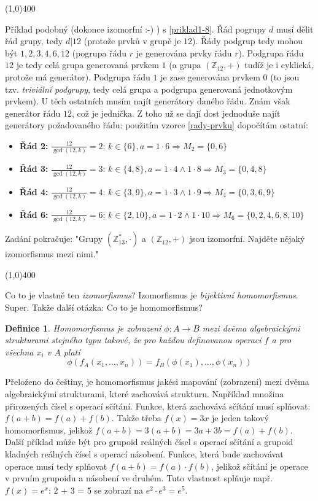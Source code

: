 \documentclass{article}
\newtheorem{definice}{Definice}[section]
\begin{document}
\line(1,0){400}

Příklad podobný (dokonce izomorfní :-) ) s \ref{priklad1-8}.
Řád pogrupy $d$ musí dělit řád grupy, tedy $d | 12$ (protože prvků v grupě je $12$). Řády podgrup tedy mohou být ${1,2,3,4,6,12}$ (pogrupa řádu $r$ je generována prvky řádu $r$). Podgrupa řádu $12$ je tedy celá grupa generovaná prvkem $1$ (a grupa $(\mathbb{Z}_{12},+)$ tudíž je i cyklická, protože má generátor). Podgrupa řádu $1$ je zase generována prvkem $0$ (to jsou tzv. \textit{triviální podgrupy}, tedy celá grupa a podgrupa generovaná jednotkovým prvkem). U těch ostatních musím najít generátory daného řádu. Znám však generátor řádu $12$, což je jednička. Z toho už se dají dost jednoduše najít generátory požadovaného řádu: použitím vzorce \ref{rady-prvku} dopočítám ostatní:

\begin{itemize}
	\item \textbf{Řád 2:} $\frac{12}{\gcd(12, k)} = 2$: $k \in \{6\}, a = 1 \cdot 6 \Rightarrow M_2 = \{0,6\}$
	\item \textbf{Řád 3:} $\frac{12}{\gcd(12, k)} = 3$: $k \in \{4,8\}, a = 1\cdot 4 \wedge 1 \cdot 8 \Rightarrow M_3 = \{0, 4, 8\}$
	\item \textbf{Řád 4:} $\frac{12}{\gcd(12, k)} = 4$: $k \in \{3,9\}, a = 1\cdot 3 \wedge 1\cdot 9 \Rightarrow M_4 = \{0, 3, 6, 9\}$
	\item \textbf{Řád 6:} $\frac{12}{\gcd(12, k)} = 6$: $k \in \{2,10\}, a = 1\cdot 2 \wedge 1 \cdot 10 \Rightarrow M_6 = \{0, 2, 4, 6, 8, 10\}$
\end{itemize}  

Zadání pokračuje:
"Grupy $(\mathbb{Z}_{13}^{*},\cdot)$ a $(\mathbb{Z}_{12},+)$ jsou izomorfní. Najděte nějaký izomorfismus mezi nimi."

\line(1,0){400}

Co to je vlastně ten \textit{izomorfismus}? Izomorfismus je \textit{bijektivní homomorfismus}. Super. Takže další otázka: Co to je homomorfismus?

\begin{definice}
\label{def-homomorfismus}
Homomorfismus je zobrazení $\phi: A \rightarrow B$ mezi dvěma algebraickými strukturami stejného typu takové, že pro každou definovanou operaci $f$ a pro všechna $x_i$ v $A$ platí
$$\phi(f_A(x_1, \ldots, x_n)) = f_B(\phi(x_1), \ldots, \phi(x_n))$$
\end{definice}

Přeloženo do češtiny, je homomorfismus jakési mapování (zobrazení) mezi dvěma algebraickými strukturami, které zachovává strukturu. Například množina přirozených čísel s operací sčítání. Funkce, která zachovává sčítání musí splňovat: $f(a + b) = f(a) + f(b)$. Takže třeba $f(x) = 3x$ je jeden takový homomorfismus, jelikož $f(a + b) = 3(a + b) = 3a + 3b = f(a) + f(b)$. 
Další příklad může být pro grupoid reálných čísel s operací sčítání a grupoid kladných reálných čísel s operací násobení. Funkce, která bude zachovávat operace musí tedy splňovat $f(a + b) = f(a) \cdot f(b)$, jelikož sčítání je operace v prvním grupoidu a násobení ve druhém. Tuto vlastnost splňuje např. $f(x) = e^x$: 2 + 3 = 5 se zobrazí na $e^2 \cdot e^3 = e^5$.
\end{document}
